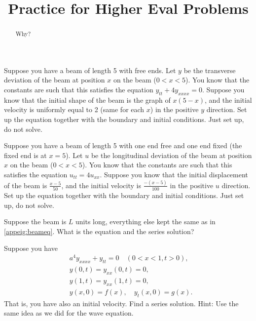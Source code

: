 \documentclass{ximera}
\title{Practice for Higher Eval Problems}
\begin{document}
\begin{abstract}
Why?
\end{abstract}
\maketitle


\begin{exercise}
    Suppose you have a beam of length 5 with free ends.  Let $y$ be the transverse deviation of the beam at position $x$ on the beam ($0 < x < 5$). You know that the constants are such that this satisfies the equation $y_{tt} + 4 y_{xxxx} = 0$. Suppose you know that the initial shape of the beam is the graph of $x(5-x)$, and the initial velocity is uniformly equal to 2 (same for each $x$) in the positive $y$ direction.  Set up the equation together with the boundary and initial conditions.  Just set up, do not solve.
\end{exercise}

\begin{exercise}
    Suppose you have a beam of length 5 with one end free and one end fixed (the fixed end is at $x=5$). Let $u$ be the longitudinal deviation of the beam at position $x$ on the beam ($0 < x < 5$). You know that the constants are such that this satisfies the equation $u_{tt} = 4 u_{xx}$. Suppose you know that the initial displacement of the beam is $\frac{x-5}{50}$, and the initial velocity is $\frac{-(x-5)}{100}$ in the positive $u$ direction.  Set up the equation together with the boundary and initial conditions.  Just set up, do not solve.
\end{exercise}

\begin{exercise}
    Suppose the beam is $L$ units long, everything else kept the same as in \eqref{appeig:beameq}.  What is the equation and the series solution?
\end{exercise}

\begin{exercise}
    Suppose you have 
    \begin{equation*}
        \begin{aligned}
            & a^4 y_{xxxx} + y_{tt} = 0 \quad (0 < x < 1, t > 0) , \\
            & y(0,t) = y_{xx}(0,t) = 0,\\
            & y(1,t) = y_{xx}(1,t) = 0 ,\\
            & y(x,0) = f(x), \quad y_{t}(x,0) = g(x) .
        \end{aligned}
    \end{equation*}
    That is, you have also an initial velocity.  Find a series solution.  Hint: Use the same idea as we did for the wave equation.
\end{exercise}
\end{document}
